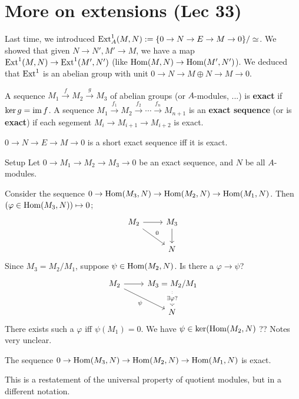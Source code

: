 \section{More on extensions (Lec 33)} 
Last time, we introduced $\operatorname{Ext}_A^1(M,N) := \{0 \to  N \to E \to M \to 0\} / \simeq $. We showed that given $N \to  N', M ' \to M$, we have a map $\operatorname{Ext} ^1(M,N) \to \operatorname{Ext}^1(M', N')$ (like $\operatorname{Hom}(M,N) \to \operatorname{Hom}(M',N')$). We deduced that $\operatorname{Ext}^1$ is an abelian group with unit $0 \to  N \to  M\oplus N \to  M \to 0$.

\begin{definition}[]
    A sequence $M_1 \xrightarrow fM_2 \xrightarrow gM_3$ of abelian groups (or $A$-modules, ...) is \textbf{exact} if $\ker g = \operatorname{im} f$. A sequence $M_1\xrightarrow{f_1} M_2\xrightarrow{f_2} \cdots \xrightarrow{f_n} M_{n+1}$ is an \textbf{exact sequence} (or is \textbf{exact}) if each segement $M_i  \to M _{i+1}\to M_{i+2}$ is exact.
\end{definition}
\begin{example}
    $0 \to N \to E \to  M \to 0$ is a short exact sequence iff it is exact.
\end{example}
\begin{namedthing}{Setup} 
   Let $0 \to  M_1 \to  M_2 \to  M_3 \to 0$ be an exact sequence, and $N$ be all $A$-modules. 
\end{namedthing}
Consider the sequence $0 \to \operatorname{Hom}(M_3, N) \to \operatorname{Hom}(M_2,N) \to  \operatorname{Hom}(M_1,N)$. Then $(\varphi  \in \operatorname{Hom}(M_3,N)) \mapsto 0$; \[
\begin{tikzcd}
    M_2 \arrow[r]\arrow[rd,"0"] & M_3\arrow[d] \\
                            & N
\end{tikzcd}
\] Since $M_3=M_2 / M_1$, suppose $\psi \in \operatorname{Hom}(M_2, N)$. Is there a $\varphi  \to  \psi$? \[
\begin{tikzcd}
M_2 \arrow[rd, "\psi"'] \arrow[r] & M_3=M_2/M_1 \arrow[d, "\exists\varphi ?" description, dotted] \\
                                  & N                                                    
\end{tikzcd}
\] There exists such a $\varphi $ iff $\psi(M_1)=0$. We have $\psi \in \ker(\operatorname{Hom}(M_2,N) $ ?? Notes very unclear. 
\begin{prop}
The sequence $0 \to \operatorname{Hom}(M_3, N) \to \operatorname{Hom}(M_2,N) \to  \operatorname{Hom}(M_1,N)$ is exact.
\end{prop}
\begin{remark}
    This is a restatement of the universal property of quotient modules, but in a different notation.
\end{remark}

